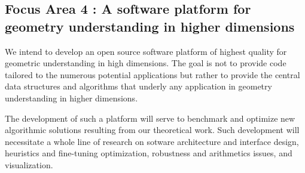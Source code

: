 
\subsection*{Focus Area 4 : A software platform for geometry understanding in higher
  dimensions}
We intend to develop an open source software platform of highest
quality %
for geometric understanding in high dimensions.  The goal
is not to provide code tailored to the numerous potential applications but
rather to provide the central data structures and algorithms that
underly any application in geometry understanding in higher
dimensions.

The development of such a platform will serve to benchmark and
optimize new algorithmic solutions resulting from our theoretical
work. Such development will 
 necessitate a whole line of research on sotware architecture and
interface design, heuristics and fine-tuning optimization, robustness
and arithmetics issues, and visualization.
%
%
%
